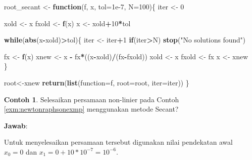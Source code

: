 \documentclass[
]{book}
\newenvironment{Shaded}{\begin{snugshade}}{\end{snugshade}}
\newcommand{\AttributeTok}[1]{\textcolor[rgb]{0.13,0.29,0.53}{#1}}
\newcommand{\ControlFlowTok}[1]{\textcolor[rgb]{0.13,0.29,0.53}{\textbf{#1}}}
\newcommand{\DecValTok}[1]{\textcolor[rgb]{0.00,0.00,0.81}{#1}}
\newcommand{\FloatTok}[1]{\textcolor[rgb]{0.00,0.00,0.81}{#1}}
\newcommand{\FunctionTok}[1]{\textcolor[rgb]{0.13,0.29,0.53}{\textbf{#1}}}
\newcommand{\NormalTok}[1]{#1}
\newcommand{\OtherTok}[1]{\textcolor[rgb]{0.56,0.35,0.01}{#1}}
\newcommand{\SpecialCharTok}[1]{\textcolor[rgb]{0.81,0.36,0.00}{\textbf{#1}}}
\newcommand{\StringTok}[1]{\textcolor[rgb]{0.31,0.60,0.02}{#1}}
\theoremstyle{definition}
\theoremstyle{definition}
\newtheorem{example}{Contoh}[chapter]
\theoremstyle{definition}
\theoremstyle{definition}
\theoremstyle{remark}
\begin{document}
\begin{Shaded}
\begin{Highlighting}[]
\NormalTok{root\_secant }\OtherTok{\textless{}{-}} \ControlFlowTok{function}\NormalTok{(f, x, }\AttributeTok{tol=}\FloatTok{1e{-}7}\NormalTok{, }\AttributeTok{N=}\DecValTok{100}\NormalTok{)\{}
\NormalTok{  iter }\OtherTok{\textless{}{-}} \DecValTok{0}
  
\NormalTok{  xold }\OtherTok{\textless{}{-}}\NormalTok{ x}
\NormalTok{  fxold }\OtherTok{\textless{}{-}} \FunctionTok{f}\NormalTok{(x)}
\NormalTok{  x }\OtherTok{\textless{}{-}}\NormalTok{ xold}\SpecialCharTok{+}\DecValTok{10}\SpecialCharTok{*}\NormalTok{tol}
  
  \ControlFlowTok{while}\NormalTok{(}\FunctionTok{abs}\NormalTok{(x}\SpecialCharTok{{-}}\NormalTok{xold)}\SpecialCharTok{\textgreater{}}\NormalTok{tol)\{}
\NormalTok{    iter }\OtherTok{\textless{}{-}}\NormalTok{ iter}\SpecialCharTok{+}\DecValTok{1}
    \ControlFlowTok{if}\NormalTok{(iter}\SpecialCharTok{\textgreater{}}\NormalTok{N)}
      \FunctionTok{stop}\NormalTok{(}\StringTok{"No solutions found"}\NormalTok{)}
    
\NormalTok{    fx }\OtherTok{\textless{}{-}} \FunctionTok{f}\NormalTok{(x)}
\NormalTok{    xnew }\OtherTok{\textless{}{-}}\NormalTok{ x }\SpecialCharTok{{-}}\NormalTok{ fx}\SpecialCharTok{*}\NormalTok{((x}\SpecialCharTok{{-}}\NormalTok{xold)}\SpecialCharTok{/}\NormalTok{(fx}\SpecialCharTok{{-}}\NormalTok{fxold))}
\NormalTok{    xold }\OtherTok{\textless{}{-}}\NormalTok{ x}
\NormalTok{    fxold }\OtherTok{\textless{}{-}}\NormalTok{ fx}
\NormalTok{    x }\OtherTok{\textless{}{-}}\NormalTok{ xnew}
\NormalTok{  \}}
  
\NormalTok{  root}\OtherTok{\textless{}{-}}\NormalTok{xnew}
  \FunctionTok{return}\NormalTok{(}\FunctionTok{list}\NormalTok{(}\StringTok{\textasciigrave{}}\AttributeTok{function}\StringTok{\textasciigrave{}}\OtherTok{=}\NormalTok{f, }\AttributeTok{root=}\NormalTok{root, }\AttributeTok{iter=}\NormalTok{iter))}
\NormalTok{\}}
\end{Highlighting}
\end{Shaded}

\begin{example}
\protect\hypertarget{exm:secantexmp}{}\label{exm:secantexmp}Selesaikan persamaan non-linier pada Contoh \ref{exm:newtonraphsonexmp} menggunakan metode Secant?
\end{example}

\textbf{Jawab}:

Untuk menyelesaikan persamaan tersebut digunakan nilai pendekatan awal \(x_0=0\) dan \(x_1=0+10*10^{-7}=10^{-6}\).
\end{document}
